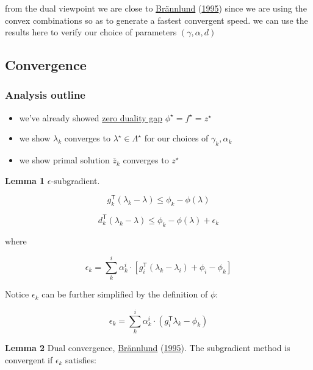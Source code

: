 \documentclass[
  a4paper,
,tablecaptionabove
]{scrartcl}
\numberwithin{equation}{section}
\providecommand{\tightlist}{%
  \setlength{\itemsep}{0pt}\setlength{\parskip}{0pt}}
\begin{document}
from the dual viewpoint we are close to
\protect\hyperlink{ref-brannlund1995generalized}{Brännlund}
(\protect\hyperlink{ref-brannlund1995generalized}{1995}) since we are
using the convex combinations so as to generate a fastest convergent
speed. we can use the results here to verify our choice of parameters
\((\gamma, \alpha, d)\)

\hypertarget{convergence}{%
  \subsection{Convergence}\label{convergence}}

\hypertarget{analysis-outline}{%
  \subsubsection{Analysis outline}\label{analysis-outline}}

\begin{itemize}
  \tightlist
  \item
        we've already showed
        \protect\hyperlink{conditions-for-strong-duality}{zero duality gap}
        \(\phi^\star = f^\star= z^\star\)
  \item
        we show \(\lambda_k\) converges to \(\lambda^\star \in \Lambda^\star\)
        for our choices of \(\gamma_k, \alpha_k\)
  \item
        we show primal solution \(\bar z_k\) converges to \(z^\star\)
\end{itemize}

\textbf{Lemma 1} \(\epsilon\)-subgradient.

\[g_{k}^\mathsf{T}(\lambda_{k}  -\lambda) \le \phi_{k} - \phi(\lambda)\]

\[d_{k}^\mathsf{T}(\lambda_{k}  -\lambda) \le \phi_{k} - \phi(\lambda) + \epsilon_k\]

where

\[\epsilon_k = \sum^i_k \alpha^i_k \cdot \left [g_i^\mathsf{T}(\lambda_k - \lambda_i) + \phi_i - \phi_k \right ]\]

Notice \(\epsilon_k\) can be further simplified by the definition of
\(\phi\):

\[\epsilon_k = \sum^i_k \alpha^i_k \cdot \left ( g_i^\mathsf{T}\lambda_k  - \phi_k \right )\]

\textbf{Lemma 2} Dual convergence,
\protect\hyperlink{ref-brannlund1995generalized}{Brännlund}
(\protect\hyperlink{ref-brannlund1995generalized}{1995}). The
subgradient method is convergent if \(\epsilon_k\) satisfies:
\end{document}
